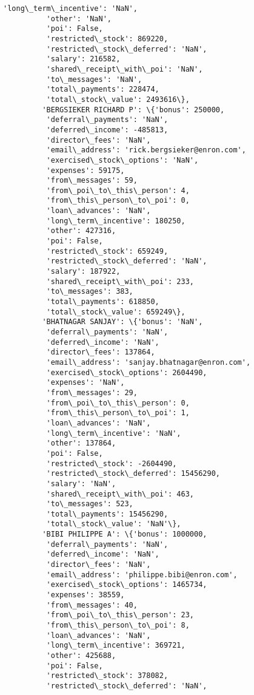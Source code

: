 \documentclass[11pt]{article}
\begin{document}
\begin{Verbatim}[commandchars=\\\{\}]
          'long\_term\_incentive': 'NaN',
          'other': 'NaN',
          'poi': False,
          'restricted\_stock': 869220,
          'restricted\_stock\_deferred': 'NaN',
          'salary': 216582,
          'shared\_receipt\_with\_poi': 'NaN',
          'to\_messages': 'NaN',
          'total\_payments': 228474,
          'total\_stock\_value': 2493616\},
         'BERGSIEKER RICHARD P': \{'bonus': 250000,
          'deferral\_payments': 'NaN',
          'deferred\_income': -485813,
          'director\_fees': 'NaN',
          'email\_address': 'rick.bergsieker@enron.com',
          'exercised\_stock\_options': 'NaN',
          'expenses': 59175,
          'from\_messages': 59,
          'from\_poi\_to\_this\_person': 4,
          'from\_this\_person\_to\_poi': 0,
          'loan\_advances': 'NaN',
          'long\_term\_incentive': 180250,
          'other': 427316,
          'poi': False,
          'restricted\_stock': 659249,
          'restricted\_stock\_deferred': 'NaN',
          'salary': 187922,
          'shared\_receipt\_with\_poi': 233,
          'to\_messages': 383,
          'total\_payments': 618850,
          'total\_stock\_value': 659249\},
         'BHATNAGAR SANJAY': \{'bonus': 'NaN',
          'deferral\_payments': 'NaN',
          'deferred\_income': 'NaN',
          'director\_fees': 137864,
          'email\_address': 'sanjay.bhatnagar@enron.com',
          'exercised\_stock\_options': 2604490,
          'expenses': 'NaN',
          'from\_messages': 29,
          'from\_poi\_to\_this\_person': 0,
          'from\_this\_person\_to\_poi': 1,
          'loan\_advances': 'NaN',
          'long\_term\_incentive': 'NaN',
          'other': 137864,
          'poi': False,
          'restricted\_stock': -2604490,
          'restricted\_stock\_deferred': 15456290,
          'salary': 'NaN',
          'shared\_receipt\_with\_poi': 463,
          'to\_messages': 523,
          'total\_payments': 15456290,
          'total\_stock\_value': 'NaN'\},
         'BIBI PHILIPPE A': \{'bonus': 1000000,
          'deferral\_payments': 'NaN',
          'deferred\_income': 'NaN',
          'director\_fees': 'NaN',
          'email\_address': 'philippe.bibi@enron.com',
          'exercised\_stock\_options': 1465734,
          'expenses': 38559,
          'from\_messages': 40,
          'from\_poi\_to\_this\_person': 23,
          'from\_this\_person\_to\_poi': 8,
          'loan\_advances': 'NaN',
          'long\_term\_incentive': 369721,
          'other': 425688,
          'poi': False,
          'restricted\_stock': 378082,
          'restricted\_stock\_deferred': 'NaN',

\end{Verbatim}
\end{document}
